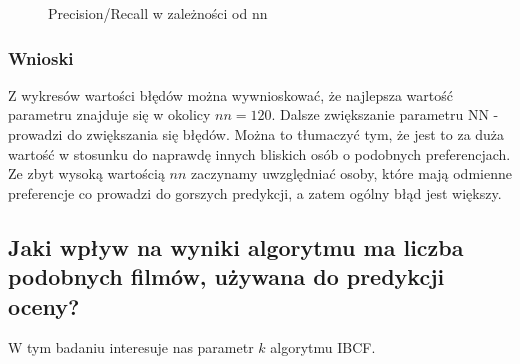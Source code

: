 \documentclass[12pt, a4paper]{article}
\begin{document}
\begin{figure}[H]
  \begin{center}
  \end{center}
  \caption{Precision/Recall w zależności od nn}
  \label{fig:ubcf-nn-rmse}
\end{figure}


\subsubsection{Wnioski}
Z wykresów wartości błędów można wywnioskować, że najlepsza wartość parametru znajduje się w okolicy $nn=120$. Dalsze zwiększanie parametru NN - prowadzi do zwiększania się błędów. Można to tłumaczyć tym, że jest to za duża wartość w stosunku do naprawdę innych bliskich osób o podobnych preferencjach. Ze zbyt wysoką wartością $nn$ zaczynamy uwzględniać osoby, które mają odmienne preferencje co prowadzi do gorszych predykcji, a zatem ogólny błąd jest większy.


\subsection{Jaki wpływ na wyniki algorytmu ma liczba podobnych filmów, używana do predykcji oceny?}
W tym badaniu interesuje nas parametr $k$ algorytmu IBCF. 
\end{document}
